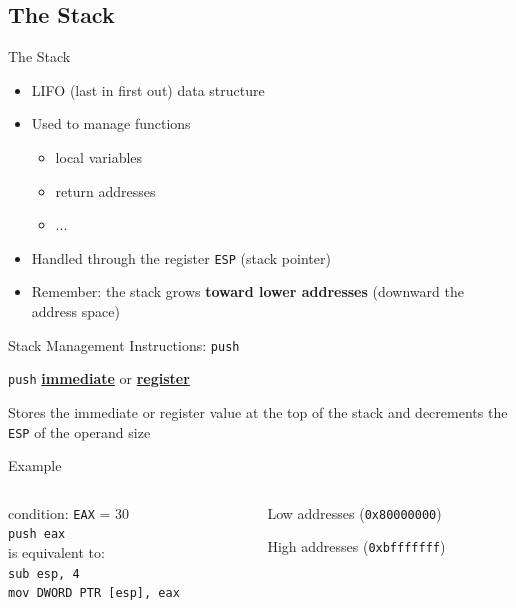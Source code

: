 \documentclass[]{beamer}
\begin{document}
\subsection{The Stack}
\begin{frame}{The Stack}
\begin{itemize}
	\item LIFO (last in first out) data structure
	\item Used to manage functions
		\begin{itemize}
		\item local variables
		\item return addresses
		\item ...
		\end{itemize}
	\item Handled through the register {\tt ESP} (stack pointer)
	\item Remember: the stack grows \textbf{toward lower addresses} (downward the address space)
\end{itemize}
\end{frame}

\begin{frame}[fragile]{Stack Management Instructions: {\tt push}}
	\par\noindent{}
	\centerline{{\tt push} \underline{{\bf immediate}} or \underline{\bf register}}
	\par\noindent Stores the immediate or register value at the top of the stack and decrements the {\tt ESP} of the operand size
	
	\begin{block}{Example}
	\begin{columns}
	\begin{column}{0.45\textwidth}
	 condition: {\tt EAX} = $30$ \\[.5em]
	{\tt push eax} \\[1em]
	is equivalent to: \\[1em]
	\alert<2>{{\small\tt sub esp, 4} \\}
	\alert<3>{{\small\tt mov DWORD PTR [esp], eax}}
	\end{column}
	
	\begin{column}{0.4\textwidth}
		\centering\par
		{\scriptsize Low addresses ({\tt 0x80000000})}\\[.5em]
		\begin{drawstack}[scale=0.7]
		\cell{}
		\cell{}
		 \only<1>{\cellptr{{\tt ESP}}}
		\end{drawstack}
		{\scriptsize High addresses ({\tt 0xbfffffff})}
	\end{column}	
	\end{columns}
	\end{block}
\end{frame}
\end{document}
